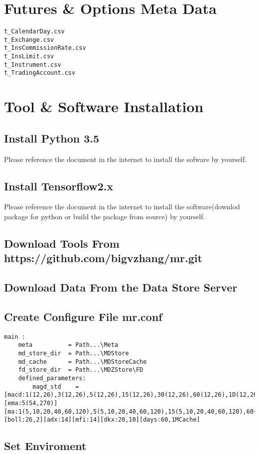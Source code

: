 \documentclass{article}
\begin{document}
\section{Futures \& Options Meta Data}
\begin{verbatim}
t_CalendarDay.csv  
t_Exchange.csv  
t_InsCommissionRate.csv  
t_InsLimit.csv 
t_Instrument.csv 
t_TradingAccount.csv
\end{verbatim}
\section{Tool \& Software Installation}

\subsection{Install Python 3.5}
	Please reference the document in the internet to install the sofware by yourself.
\subsection{Install Tensorflow2.x}
	Please reference the document in the internet to install the software(downlod package for python or build the package from source) by yourself.
\subsection{Download Tools From https://github.com/bigvzhang/mr.git}
\subsection{Download Data From the Data Store Server}
\subsection{Create Configure File mr.conf}
\begin{verbatim}
main :
	meta          = Path...\Meta
	md_store_dir  = Path...\MDStore
	md_cache      = Path...\MDStoreCache
	fd_store_dir  = Path...\MDZStore\FD
	defined_parameters:
		magd_std    = [macd:1(12,26),3(12,26),5(12,26),15(12,26),30(12,26),60(12,26),1D(12,26)][ema:5(54,270)][ma:1(5,10,20,40,60,120),5(5,10,20,40,60,120),15(5,10,20,40,60,120),60(5,10,20,40,60,120)][boll:26,2][adx:14][mfi:14][dkx:20,10][days:60,1MCache]

\end{verbatim}
\subsection{Set Enviroment}
\end{document}
